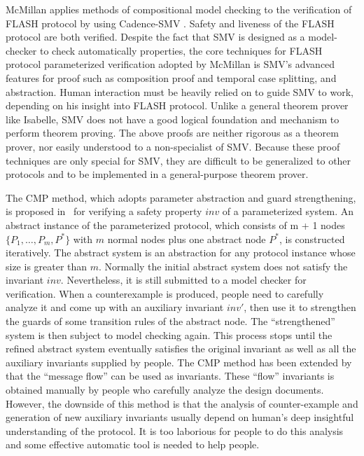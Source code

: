 \documentclass{llncs}
\newcommand{\bedt}[1]{{\color{blue}#1}}
\begin{document}
McMillan applies methods of compositional model
checking \cite{McMillan2001} to the verification of FLASH protocol by using Cadence-SMV \cite{cadenceSMV}. %
Safety and liveness of the
FLASH protocol are both verified. Despite the fact that SMV is designed as a model-checker to  check automatically properties, the core techniques for FLASH protocol parameterized verification adopted by McMillan is SMV's advanced features for proof such as composition proof and temporal case splitting, and abstraction. Human interaction must be heavily relied on to  guide SMV to work, depending on his insight into FLASH protocol. Unlike a general theorem prover like Isabelle, SMV does not have a good logical foundation and mechanism to perform theorem proving. The above proofs are neither rigorous as a theorem prover, nor easily understood to a non-specialist of SMV.  Because these proof techniques are  only special for SMV,  they are  difficult to be generalized to other protocols and to be implemented in a general-purpose theorem prover.

The CMP method, which adopts parameter abstraction and guard strengthening, is proposed
in~\cite{Chou2004} for verifying a safety property $inv$ of
a parameterized system.
 An abstract instance of the parameterized protocol,  which consists of m + 1
nodes $\{P_1, \ldots , P_m, P^*\}$ with $m$ normal nodes plus one
abstract node $P^*$, is constructed iteratively. The abstract system is an
abstraction for any protocol instance whose size is greater than
$m$. Normally the initial abstract system does not satisfy the
invariant $inv$. Nevertheless, it is still submitted to a model
checker for verification. When a counterexample is produced, people need to
carefully analyze it and come up with an auxiliary invariant
$inv'$, then use it to strengthen the guards of some transition
rules of the abstract node. The ``strengthened'' system is then
subject to model checking again. This process stops until the
refined abstract system  eventually satisfies the original invariant
  as well as all the auxiliary invariants supplied by people. %
\bedt{The CMP method has been extended by \cite{Talupur2008a} that the ``message flow'' can be used as invariants. These ``flow'' invariants is obtained manually by people who carefully analyze the design documents.
 However, the downside of this method is that the analysis of counter-example and generation of new auxiliary invariants usually
 depend on human's deep insightful understanding of the protocol.} It is too laborious for people to do this analysis and some effective automatic  tool is needed to help people.
\end{document}
